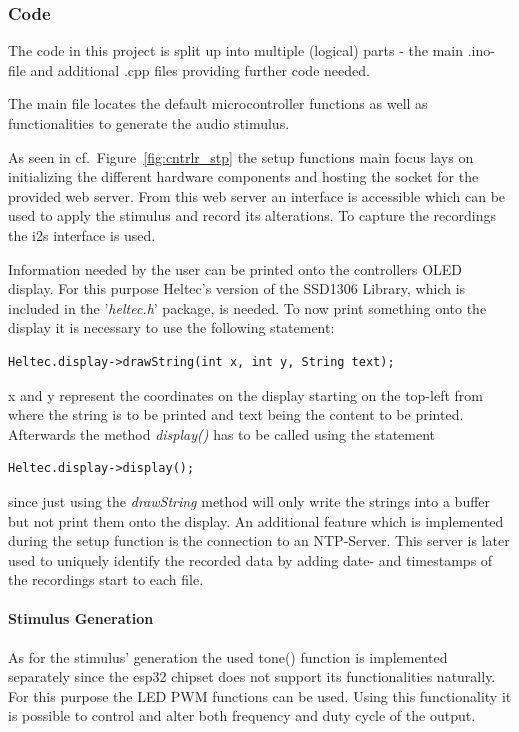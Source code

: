\subsubsection{Code}
The code in this project is split up into multiple (logical) parts - the main .ino-file and additional .cpp files providing further code needed.

The main file locates the default microcontroller functions as well as functionalities to generate the audio stimulus.

As seen in cf.~Figure~\ref{fig:cntrlr_stp} the setup functions main focus lays on initializing the different hardware components and hosting the socket for the provided web server.
From this web server an interface is accessible which can be used to apply the stimulus and record its alterations.
To capture the recordings the i2s interface is used.

Information needed by the user can be printed onto the controllers OLED display.
For this purpose Heltec's version of the SSD1306 Library, which is included in the '\textit{heltec.h}' package, is needed.
To now print something onto the display it is necessary to use the following statement:
\begin{lstlisting}[style=inText]
	Heltec.display->drawString(int x, int y, String text);
\end{lstlisting}
x and y represent the coordinates on the display starting on the top-left from where the string is to be printed and text being the content to be printed.
Afterwards the method \textit{display()} has to be called using the statement
\begin{lstlisting}[style=inText]
	Heltec.display->display();
\end{lstlisting}
since just using the \textit{drawString} method will only write the strings into a buffer but not print them onto the
display.
An additional feature which is implemented during the setup function is the connection to an NTP-Server.
This server is later used to uniquely identify the recorded data by adding date- and timestamps of the recordings start to each file.

\paragraph{Stimulus Generation}
As for the stimulus' generation the used tone() function is implemented separately since the esp32 chipset does not support its functionalities naturally.
For this purpose the LED PWM functions can be used.
Using this functionality it is possible to control and alter both frequency and duty cycle of the output.

